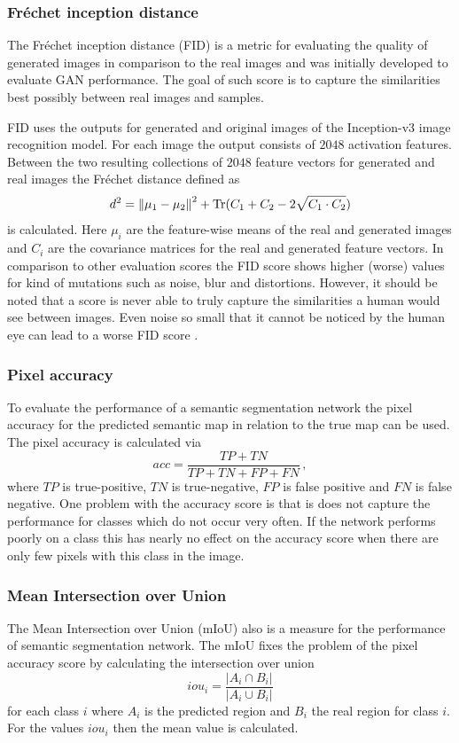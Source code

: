\subsubsection{Fréchet inception distance} \label{fid}
The Fréchet inception distance (FID) \cite{fid} is a metric for evaluating the quality of generated images in comparison to the real images and was initially developed to evaluate GAN performance. The goal of such score is to capture the similarities best possibly between real images and samples.

FID uses the outputs for generated and original images of the Inception-v3 \cite{inception-v3} image recognition model. For each image the output consists of $2048$ activation features. Between the two resulting collections of $2048$ feature vectors for generated and real images the Fréchet distance defined as 
%
\begin{equation}
    d^2=\left\lVert\mu_1-\mu_2\right\rVert^2+\text{Tr}(C_1+C_2-2\sqrt{C_1\cdot C_2})
\end{equation}
%
is calculated. Here $\mu_i$ are the feature-wise means of the real and generated images and $C_i$ are the covariance matrices for the real and generated feature vectors. In comparison to other evaluation scores the FID score shows higher (worse) values for  kind of mutations such as noise, blur and distortions. However, it should be noted that a score is never able to truly capture the similarities a human would see between images. Even noise so small that it cannot be noticed by the human eye can lead to a worse FID score \cite{score_4}.

\subsubsection{Pixel accuracy} \label{acc}
To evaluate the performance of a semantic segmentation network the pixel accuracy for the predicted semantic map in relation to the true map can be used. The pixel accuracy is calculated via
%
\begin{equation}
    acc=\frac{TP+TN}{TP+TN+FP+FN}\,,
\end{equation}
%
where $TP$ is true-positive, $TN$ is true-negative, $FP$ is false positive and $FN$ is false negative. One problem with the accuracy score is that is does not capture the performance for classes which do not occur very often. If the network performs poorly on a class this has nearly no effect on the accuracy score when there are only few pixels with this class in the image.
%
\subsubsection{Mean Intersection over Union} \label{iou}
The Mean Intersection over Union (mIoU) also is a measure for the performance of semantic segmentation network. The mIoU fixes the problem of the pixel accuracy score by calculating the intersection over union
%
\begin{equation}
    iou_{i}=\frac{|A_i\cap B_i|}{|A_i \cup B_i|}
\end{equation}
%
for each class $i$ where $A_i$ is the predicted region and $B_i$ the real region for class $i$. For the values $iou_i$ then the mean value is calculated.
%
